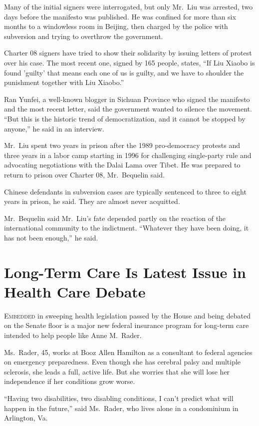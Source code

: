 ﻿\documentclass[12pt]{article}
\begin{document}
Many of the initial signers were interrogated\cite{interrogate}, but only Mr.~Liu was arrested, two
days before the manifesto was published. He was confined for more than six months to a windowless
room in Beijing, then charged by the police with subversion and trying to overthrow the government.

Charter 08 signers have tried to show their solidarity by issuing letters of protest over his case.
The most recent one, signed by 165 people, states, ``If Liu Xiaobo is found 'guilty' that means each
one of us is guilty, and we have to shoulder the punishment together with Liu Xiaobo.''

Ran Yunfei, a well-known blogger in Sichuan Province who signed the manifesto and the most recent
letter, said the government wanted to silence the movement. ``But this is the historic trend of
democratization, and it cannot be stopped by anyone,'' he said in an interview.

Mr.~Liu spent two years in prison after the 1989 pro-democracy protests and three years in a labor
camp starting in 1996 for challenging single-party rule and advocating negotiations with the Dalai
Lama over Tibet. He was prepared to return to prison over Charter 08, Mr.~Bequelin said.

Chinese defendants in subversion cases are typically sentenced to three to eight years in prison, he
said. They are almost never acquitted.

Mr.~Bequelin said Mr.~Liu's fate depended partly on the reaction of the international community to
the indictment. ``Whatever they have been doing, it has not been enough,'' he said.

\section{Long-Term Care Is Latest Issue in Health Care Debate}

\lettrine{E}{mbedded} in sweeping health legislation passed by the House and
being debated on the Senate floor is a major new federal insurance program for long-term care
intended to help people like Anne M.~Rader.

Ms.~Rader, 45, works at Booz Allen Hamilton as a consultant to federal agencies on emergency
preparedness. Even though she has cerebral palsy and multiple sclerosis, she leads a full, active
life. But she worries that she will lose her independence if her conditions grow worse.

``Having two disabilities, two disabling conditions, I can't predict what will happen in the
future,'' said Ms.~Rader, who lives alone in a condominium in Arlington, Va.
\end{document}
